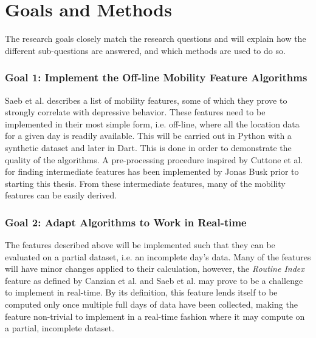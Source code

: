 \section{Goals and Methods}


The research goals closely match the research questions and will explain how the different sub-questions are answered, and which methods are used to do so.

\subsubsection*{Goal 1: Implement the Off-line Mobility Feature Algorithms}
Saeb et al. \cite{Saeb2015} describes a list of mobility features, some of which they prove to strongly correlate with depressive behavior. These features need to be implemented in their most simple form, i.e. off-line, where all the location data for a given day is readily available. This will be carried out in Python with a synthetic dataset and later in Dart. This is done in order to demonstrate the quality of the algorithms. A pre-processing procedure inspired by Cuttone et al. \cite{sparse-location-2014} for finding intermediate features has been implemented by Jonas Busk prior to starting this thesis. From these intermediate features, many of the mobility features can be easily derived. 

\subsubsection*{Goal 2: Adapt Algorithms to Work in Real-time}
The features described above will be implemented such that they can be evaluated on a partial dataset, i.e. an incomplete day's data. Many of the features will have minor changes applied to their calculation, however, the \textit{Routine Index} feature as defined by Canzian et al.\cite{Canzian2015} and Saeb et al. \cite{Saeb2015} may prove to be a challenge to implement in real-time. By its definition, this feature lends itself to be computed only once multiple full days of data have been collected, making the feature non-trivial to implement in a real-time fashion where it may compute on a partial, incomplete dataset. 

